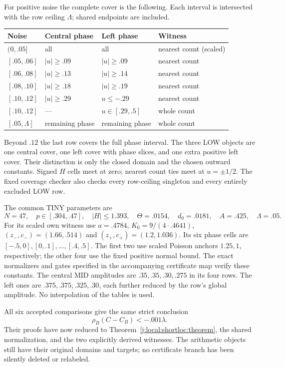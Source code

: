 For positive noise the complete cover is the following. Each interval is
intersected with the row ceiling $\Lambda$; shared endpoints are included.
\begin{center}\small
\begin{tabular}{@{}llll@{}}\toprule
Noise & Central phase & Left phase & Witness\\\midrule
$(0,.05]$ & all & all & nearest count (scaled)\\
$[.05,.06]$ & $|u|\ge.09$ & $|u|\ge.09$ & nearest count\\
$[.06,.08]$ & $|u|\ge.13$ & $|u|\ge.14$ & nearest count\\
$[.08,.10]$ & $|u|\ge.18$ & $|u|\ge.19$ & nearest count\\
$[.10,.12]$ & $|u|\ge.29$ & $u\le-.29$ & nearest count\\
$[.10,.12]$ & --- & $u\in[.29,.5]$ & whole count\\
$[.05,\Lambda]$ & remaining phase & remaining phase & whole count\\\bottomrule
\end{tabular}
\end{center}
Beyond $.12$ the last row covers the full phase interval. The three LOW
objects are one central cover, one left cover with phase slices, and one
extra positive left cover. Their distinction is only the closed domain
and the chosen outward constants. Signed $H$ cells meet at zero; nearest
count ties meet at $u=\pm1/2$. The fixed coverage checker also checks every
row-ceiling singleton and every entirely excluded LOW row.

The common TINY parameters are
\[
 N=47,\quad p\in[.304,.47],\quad |H|\le1.393,\quad
 \Theta=.0154,\quad d_0=.0181,\quad A=.425,\quad\Lambda=.05.
\]
For its scaled own witness use $a=.4784$, $K_0=9/(4\cdot.4641)$,
$(z_-,c_-)=(1.66,.514)$ and $(z_+,c_+)=(1.2,1.036)$.
Its six phase cells are $[-.5,0],[0,.1],\ldots,[.4,.5]$.
The first two use scaled Poisson anchors $1.25,1$, respectively; the other
four use the fixed positive normal bound. The exact normalizers and gates
specified in the accompanying certificate map verify these constants.
The central MID amplitudes are $.35,.35,.30,.275$ in its four rows.
The left ones are $.375,.375,.325,.30$, each further reduced by the row's
global amplitude. No interpolation of the tables is used.

All six accepted comparisons give the same strict conclusion
\[
                        \rho_B(C-C_B)<-.001\lambda.
\]
Their proofs have now reduced to Theorem~\ref{j:local:shortloc:theorem}, the shared
normalization, and the two explicitly derived witnesses. The arithmetic
objects still have their original domains and targets; no certificate
branch has been silently deleted or relabeled.

